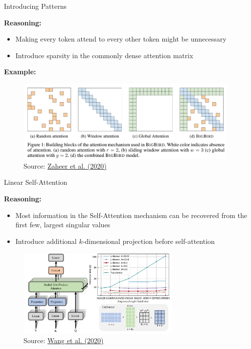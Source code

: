 \documentclass[]{beamer}
\begin{document}
\begin{frame}{Introducing Patterns}

\textbf{Reasoning:} 

\begin{itemize}
	\item Making every token attend to every other token might be unnecessary
	\item Introduce sparsity in the commonly dense attention matrix
\end{itemize}

\textbf{Example:}

	\begin{figure}
		\centering
		\includegraphics[width = 11cm]{figure/bigbird-patterns.png}\\ 
		{\footnotesize Source: \href{https://proceedings.neurips.cc//paper/2020/file/c8512d142a2d849725f31a9a7a361ab9-Paper.pdf}{Zaheer et al. (2020)}}
	\end{figure}
\end{frame}



\begin{frame}{Linear Self-Attention \href{https://arxiv.org/pdf/2006.04768.pdf}{}}

\textbf{Reasoning:} 

\begin{itemize}
	\item Most information in the Self-Attention mechanism can be recovered from the first few, largest singular values
	\item Introduce additional $k$-dimensional projection before self-attention
\end{itemize}

	\begin{figure}
		\centering
		\includegraphics[width = 8cm]{figure/linformer.png}\\ 
		{\footnotesize Source: \href{https://arxiv.org/pdf/2006.04768.pdf}{Wang et al. (2020)}}
	\end{figure}
\end{frame}
\end{document}
